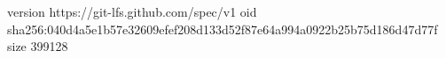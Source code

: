 version https://git-lfs.github.com/spec/v1
oid sha256:040d4a5e1b57e32609efef208d133d52f87e64a994a0922b25b75d186d47d77f
size 399128
